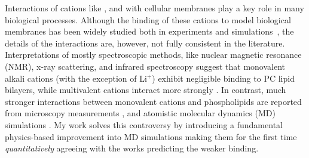 \documentclass[12pt,a4paper,twoside,openright]{report}
\begin{document}
Interactions of cations like ,  and  with cellular membranes 
play a key role in many biological processes. 
Although the binding of these cations to model biological membranes 
has been widely studied both in
experiments and simulations~\citep{catte16, nmrlipids_proj4},
the details of the interactions are, however, not fully consistent in the literature.
Interpretations of mostly spectroscopic methods, like nuclear magnetic resonance (NMR), 
x-ray scattering, and infrared spectroscopy suggest that monovalent alkali cations (with the exception of Li$^+$) 
exhibit negligible binding to PC lipid bilayers, 
while multivalent cations interact more strongly 
\citep{cevc90,tocanne90, hauser76,hauser78,herbette84,altenbach84,uhrikova08}.
In contrast, much stronger interactions between monovalent cations and phospholipids are reported from 
microscopy measurements \citep{harb13,manyes06,fukuma07,ferber11,morata12},
and atomistic molecular dynamics (MD) simulations \citep{cordomi09,valley11,berkowitz12,catte16,nmrlipids_proj4,melcr18}.
My work solves this controversy
by introducing a fundamental physics-based improvement into MD simulations
making them for the first time \emph{quantitatively} agreeing with the works predicting the weaker binding. 
\end{document}
